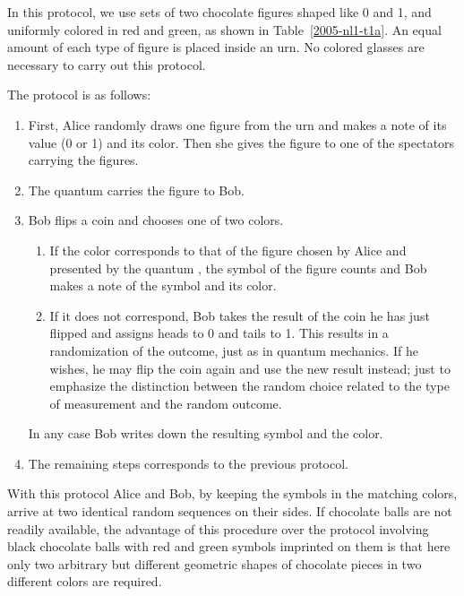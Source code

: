 \documentclass[prb,amssymb,preprint]{revtex4}
\begin{document}
In this protocol, we use sets of two chocolate figures shaped like 0 and 1,
and uniformly colored in red and green, as shown in
Table~\ref{2005-nl1-t1a}. An equal amount of each type of figure is placed
inside an urn. No colored glasses are necessary to carry out this protocol.

The protocol is as follows:

\begin{enumerate}

\item First, Alice randomly draws one figure from the urn and makes a
note of its value (0 or 1) and its color. Then she gives the figure to one
of the spectators carrying the figures.

\item
The quantum carries the figure to Bob.

\item
Bob flips a coin and chooses one of two colors.

\begin{enumerate}

\item If the color corresponds to that of the figure chosen by Alice and
presented by the quantum ,
the symbol of the figure counts and Bob makes a note of the symbol and its
color.

\item If it does not correspond, Bob takes the result of the coin he has
just flipped and assigns heads to 0 and tails to 1.
This results in a randomization of the outcome, just as in quantum mechanics.
If he
wishes, he may flip the coin
again and use the new result
instead; just to emphasize the distinction between the random choice related to the
type of measurement and  the random outcome.
\end{enumerate}
In any case Bob writes down the resulting symbol and the color.

\item The remaining steps corresponds to the previous protocol.

\end{enumerate}

With this protocol Alice and Bob, by keeping the symbols in the matching
colors, arrive at two identical random sequences on their sides.
If chocolate balls are not readily available,
the advantage of this procedure over the protocol involving black chocolate balls
with red and green symbols imprinted on them
is that here only
two arbitrary but different geometric shapes of chocolate pieces in two different colors are required.
\end{document}
